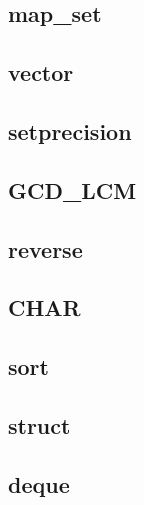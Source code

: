         \subsection{map_set}
                
        \subsection{vector}
                
        \subsection{setprecision}
                
        \subsection{GCD_LCM}
                
        \subsection{reverse}
                
        \subsection{CHAR}
                
        \subsection{sort}
                
        \subsection{struct}
                
        \subsection{deque}
                